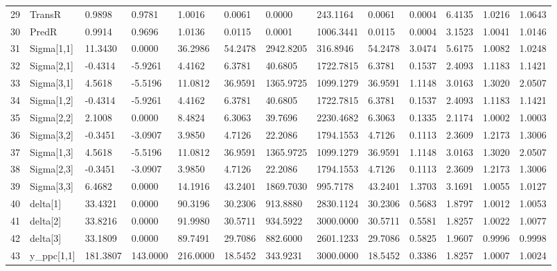 \begin{table}[ht]
\begin{tabular}{rllllllllllll}
  29 & TransR &   0.9898 &   0.9781 &   1.0016 &  0.0061 &    0.0000 &  243.1164 &  0.0061 & 0.0004 &  6.4135 & 1.0216 & 1.0643 \\ 
  30 & PredR &   0.9914 &   0.9696 &   1.0136 &  0.0115 &    0.0001 & 1006.3441 &  0.0115 & 0.0004 &  3.1523 & 1.0041 & 1.0146 \\ 
  31 & Sigma[1,1] &  11.3430 &   0.0000 &  36.2986 & 54.2478 & 2942.8205 &  316.8946 & 54.2478 & 3.0474 &  5.6175 & 1.0082 & 1.0248 \\ 
  32 & Sigma[2,1] &  -0.4314 &  -5.9261 &   4.4162 &  6.3781 &   40.6805 & 1722.7815 &  6.3781 & 0.1537 &  2.4093 & 1.1183 & 1.1421 \\ 
  33 & Sigma[3,1] &   4.5618 &  -5.5196 &  11.0812 & 36.9591 & 1365.9725 & 1099.1279 & 36.9591 & 1.1148 &  3.0163 & 1.3020 & 2.0507 \\ 
  34 & Sigma[1,2] &  -0.4314 &  -5.9261 &   4.4162 &  6.3781 &   40.6805 & 1722.7815 &  6.3781 & 0.1537 &  2.4093 & 1.1183 & 1.1421 \\ 
  35 & Sigma[2,2] &   2.1008 &   0.0000 &   8.4824 &  6.3063 &   39.7696 & 2230.4682 &  6.3063 & 0.1335 &  2.1174 & 1.0002 & 1.0003 \\ 
  36 & Sigma[3,2] &  -0.3451 &  -3.0907 &   3.9850 &  4.7126 &   22.2086 & 1794.1553 &  4.7126 & 0.1113 &  2.3609 & 1.2173 & 1.3006 \\ 
  37 & Sigma[1,3] &   4.5618 &  -5.5196 &  11.0812 & 36.9591 & 1365.9725 & 1099.1279 & 36.9591 & 1.1148 &  3.0163 & 1.3020 & 2.0507 \\ 
  38 & Sigma[2,3] &  -0.3451 &  -3.0907 &   3.9850 &  4.7126 &   22.2086 & 1794.1553 &  4.7126 & 0.1113 &  2.3609 & 1.2173 & 1.3006 \\ 
  39 & Sigma[3,3] &   6.4682 &   0.0000 &  14.1916 & 43.2401 & 1869.7030 &  995.7178 & 43.2401 & 1.3703 &  3.1691 & 1.0055 & 1.0127 \\ 
  40 & delta[1] &  33.4321 &   0.0000 &  90.3196 & 30.2306 &  913.8880 & 2830.1124 & 30.2306 & 0.5683 &  1.8797 & 1.0012 & 1.0053 \\ 
  41 & delta[2] &  33.8216 &   0.0000 &  91.9980 & 30.5711 &  934.5922 & 3000.0000 & 30.5711 & 0.5581 &  1.8257 & 1.0022 & 1.0077 \\ 
  42 & delta[3] &  33.1809 &   0.0000 &  89.7491 & 29.7086 &  882.6000 & 2601.1233 & 29.7086 & 0.5825 &  1.9607 & 0.9996 & 0.9998 \\ 
  43 & y\_ppc[1,1] & 181.3807 & 143.0000 & 216.0000 & 18.5452 &  343.9231 & 3000.0000 & 18.5452 & 0.3386 &  1.8257 & 1.0007 & 1.0024 \\ 

\end{tabular}
\end{table}
